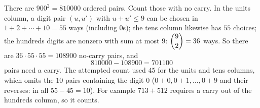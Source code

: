 There are $900^2=810000$ ordered pairs. Count those with no carry. In the units column, a digit pair $(u,u')$ with $u+u'\le9$ can be chosen in $1+2+\cdots+10=55$ ways (including $0$s); the tens column likewise has $55$ choices; the hundreds digits are nonzero with sum at most $9$: $\dbinom92=36$ ways. So there are $36\cdot55\cdot55=108900$ no-carry pairs, and
\[810000-108900=\boxed{701100}\]
pairs need a carry. The attempted count used $45$ for the units and tens columns, which omits the $10$ pairs containing the digit $0$ ($0+0,0+1,\dots,0+9$ and their reverses: in all $55-45=10$). For example $713+512$ requires a carry out of the hundreds column, so it counts.
